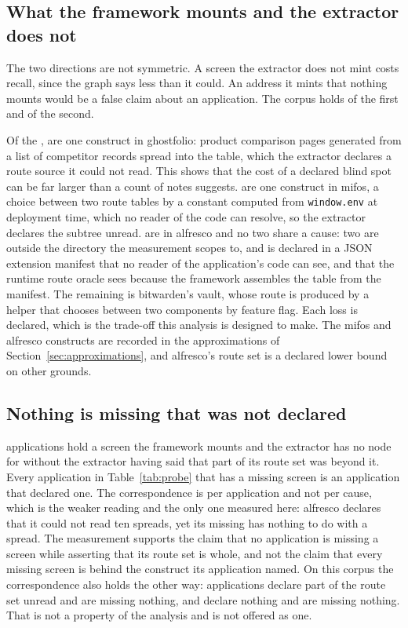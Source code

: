 \subsection{What the framework mounts and the extractor does not}

The two directions are not symmetric. A screen the extractor does not mint costs recall, since the graph says less than it could. An address it mints that nothing mounts would be a false claim about an application. The corpus holds \ProbeMissed{} of the first and \ProbeInvented{} of the second.

Of the \ProbeMissed{}, \ProbeMissedGhostfolio{} are one construct in ghostfolio: product comparison pages generated from a list of competitor records spread into the table, which the extractor declares a route source it could not read. This shows that the cost of a declared blind spot can be far larger than a count of notes suggests. \ProbeMissedMifos{} are one construct in mifos, a choice between two route tables by a constant computed from \texttt{window.env} at deployment time, which no reader of the code can resolve, so the extractor declares the subtree unread. \ProbeMissedAlfresco{} are in alfresco and no two share a cause: two are outside the directory the measurement scopes to, and  is declared in a JSON extension manifest that no reader of the application's code can see, and that the runtime route oracle sees because the framework assembles the table from the manifest. The remaining \ProbeMissedBitwarden{} is bitwarden's vault, whose route is produced by a helper that chooses between two components by feature flag. Each loss is declared, which is the trade-off this analysis is designed to make. The mifos and alfresco constructs are recorded in the approximations of Section~\ref{sec:approximations}, and alfresco's route set is a declared lower bound on other grounds.

\subsection{Nothing is missing that was not declared}

\ProbeMissedWithoutDeclaration{} applications hold a screen the framework mounts and the extractor has no node for without the extractor having said that part of its route set was beyond it. Every application in Table~\ref{tab:probe} that has a missing screen is an application that declared one. The correspondence is per application and not per cause, which is the weaker reading and the only one measured here: alfresco declares that it could not read ten spreads, yet its missing  has nothing to do with a spread. The measurement supports the claim that no application is missing a screen while asserting that its route set is whole, and not the claim that every missing screen is behind the construct its application named. On this corpus the correspondence also holds the other way: \ProbeDeclaredButComplete{} applications declare part of the route set unread and are missing nothing, and \ProbeSilentAndComplete{} declare nothing and are missing nothing. That is not a property of the analysis and is not offered as one.

